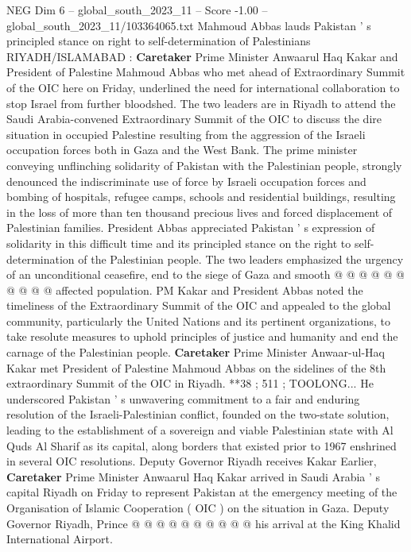 \begin{textsample}{NEG Dim 6 – global\_south\_2023\_11 – Score -1.00 – global\_south\_2023\_11/103364065.txt}  \label{ex:f6_neg_153}
Mahmoud Abbas lauds Pakistan ' s principled stance on right to self-determination of Palestinians RIYADH/ISLAMABAD : \textbf{Caretaker} Prime Minister Anwaarul Haq Kakar and President of Palestine Mahmoud Abbas who met ahead of Extraordinary Summit of the OIC here on Friday, underlined the need for international collaboration to stop Israel from further bloodshed.
The two leaders are in Riyadh to attend the Saudi Arabia-convened Extraordinary Summit of the OIC to discuss the dire situation in occupied Palestine resulting from the aggression of the Israeli occupation forces both in Gaza and the West Bank.
The prime minister conveying unflinching solidarity of Pakistan with the Palestinian people, strongly denounced the indiscriminate use of force by Israeli occupation forces and bombing of hospitals, refugee camps, schools and residential buildings, resulting in the loss of more than ten thousand precious lives and forced displacement of Palestinian families.
President Abbas appreciated Pakistan ' s expression of solidarity in this difficult time and its principled stance on the right to self-determination of the Palestinian people.
The two leaders emphasized the urgency of an unconditional ceasefire, end to the siege of Gaza and smooth @ @ @ @ @ @ @ @ @ @ affected population.
PM Kakar and President Abbas noted the timeliness of the Extraordinary Summit of the OIC and appealed to the global community, particularly the United Nations and its pertinent organizations, to take resolute measures to uphold principles of justice and humanity and end the carnage of the Palestinian people. \textbf{Caretaker} Prime Minister Anwaar-ul-Haq Kakar met President of Palestine Mahmoud Abbas on the sidelines of the 8th extraordinary Summit of the OIC in Riyadh. **38 ; 511 ; TOOLONG...
He underscored Pakistan ' s unwavering commitment to a fair and enduring resolution of the Israeli-Palestinian conflict, founded on the two-state solution, leading to the establishment of a sovereign and viable Palestinian state with Al Quds Al Sharif as its capital, along borders that existed prior to 1967 enshrined in several OIC resolutions.
Deputy Governor Riyadh receives Kakar Earlier, \textbf{Caretaker} Prime Minister Anwaarul Haq Kakar arrived in Saudi Arabia ' s capital Riyadh on Friday to represent Pakistan at the emergency meeting of the Organisation of Islamic Cooperation ( OIC ) on the situation in Gaza.
Deputy Governor Riyadh, Prince @ @ @ @ @ @ @ @ @ @ his arrival at the King Khalid International Airport.

\end{textsample}
